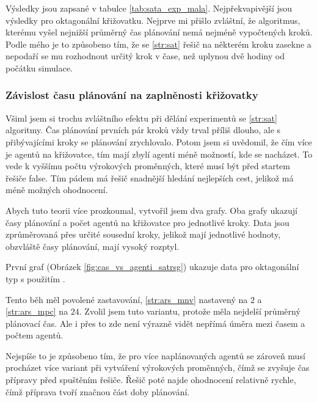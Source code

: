 Výsledky jsou zapsané v tabulce \ref{tab:sata_exp_mala}.
Nejpřekvapivější jsou výsledky pro oktagonální křižovatku.
Nejprve mi přišlo zvláštní, že algoritmus, kterému vyšel nejnižší průměrný čas plánování nemá nejméně vypočtených kroků.
Podle mého je to způsobeno tím, že se \ref{str:sat} řešič na některém kroku zasekne a nepodaří se mu rozhodnout
určitý krok v čase, než uplynou dvě hodiny od počátku simulace.



\subsubsection{Závislost času plánování na zaplněnosti křižovatky}
\label{subsubsec:sat_zavislost_casu_a_agentu}

Všiml jsem si trochu zvláštního efektu při dělání experimentů se \ref{str:sat} algoritmy.
Čas plánování prvních pár kroků vždy trval příliš dlouho, ale s přibývajícími kroky se plánování zrychlovalo.
Potom jsem si uvědomil, že čím více je agentů na křižovatce, tím mají zbylí agenti méně možností, kde se nacházet.
To vede k vyššímu počtu výrokových proměnných, které musí být před startem řešiče \textrm{false}.
Tím pádem má řešič snadnější hledání nejlepších cest, jelikož má méně možných ohodnocení.

Abych tuto teorii více prozkoumal, vytvořil jsem dva grafy.
Oba grafy ukazují časy plánování a počet agentů na křižovatce pro jednotlivé kroky.
Data jsou zprůměrovaná přes určité sousední kroky, jelikož mají jednotlivé hodnoty,
obzvláště časy plánování, mají vysoký rozptyl.

První graf (Obrázek \ref{fig:cas_vs_agenti_satrsg}) ukazuje data pro oktagonální typ s použitím .

Tento běh měl povolené zastavování, \ref{str:ars_mnv} nastavený na $2$ a \ref{str:ars_mpc} na $24$.
Zvolil jsem tuto variantu, protože měla nejdelší průměrný plánovací čas.
Ale i přes to zde není výrazně vidět nepřímá úměra mezi časem a počtem agentů.

Nejspíše to je způsobeno tím, že pro více naplánovaných agentů se zároveň musí procházet více variant
při vytváření výrokových proměnných, čímž se zvyšuje čas přípravy před spuštěním řešiče.
Řešič poté najde ohodnocení relativně rychle, čímž příprava tvoří značnou část doby plánování.

